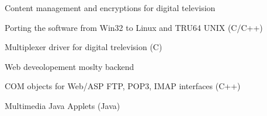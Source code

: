 \documentclass[a4paper]{deedy-resume} %
\begin{document}
\begin{minipage}[t]{0.66\textwidth}
	Content management and encryptions for digital television
	\begin{tightitemize}
		\item Porting the software from Win32 to Linux and TRU64 UNIX (C/C++)
		\item Multiplexer driver for digital trelevision (C)
	\end{tightitemize}

\sectionspace %


	Web deveolopement moslty backend
	\begin{tightitemize}
		\item COM objects for Web/ASP FTP, POP3, IMAP interfaces (C++)
		\item Multimedia Java Applets (Java)
	\end{tightitemize}

\sectionspace %

\end{minipage}%
\hfill


\newpage %
\bigskip
\end{document}
